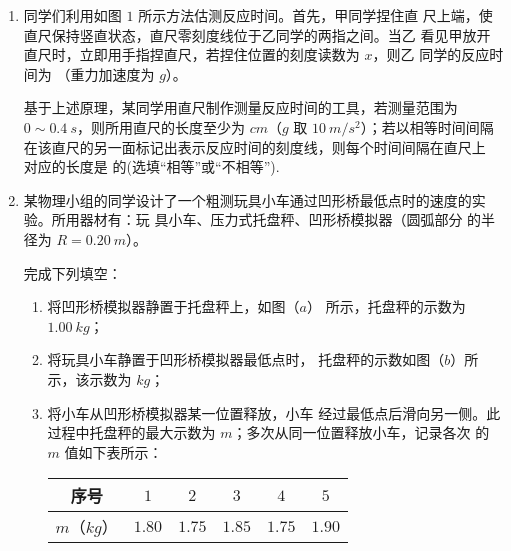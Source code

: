 \begin{enumerate}
\renewcommand{\labelenumi}{\arabic{enumi}.}
\item
{}
同学们利用如图 $ 1 $ 所示方法估测反应时间。首先，甲同学捏住直
尺上端，使直尺保持竖直状态，直尺零刻度线位于乙同学的两指之间。当乙
看见甲放开直尺时，立即用手指捏直尺，若捏住位置的刻度读数为 $ x $，则乙
同学的反应时间为  
（重力加速度为 $ g $）。
\begin{figure}[h!]
\centering

\end{figure}



基于上述原理，某同学用直尺制作测量反应时间的工具，若测量范围为 $ 0 \sim 0.4 \ s $，则所用直尺的长度至少为
$ cm $（$ g $ 取 $ 10 \ m/s^{2} $）；若以相等时间间隔
在该直尺的另一面标记出表示反应时间的刻度线，则每个时间间隔在直尺上
对应的长度是
的(选填“相等”或“不相等”).




\newpage
\item 
{}
某物理小组的同学设计了一个粗测玩具小车通过凹形桥最低点时的速度的实验。所用器材有：玩
具小车、压力式托盘秤、凹形桥模拟器（圆弧部分
的半径为 $ R=0.20 \ m $）。
\begin{figure}[h!]
\centering

\end{figure}



完成下列填空：
\begin{enumerate}
\renewcommand{\labelenumi}{\arabic{enumi}.}
\item
将凹形桥模拟器静置于托盘秤上，如图（$ a $）
所示，托盘秤的示数为 $ 1.00 \ kg $；

\item 
将玩具小车静置于凹形桥模拟器最低点时，
托盘秤的示数如图（$ b $）所示，该示数为  $ kg $；

\item 
将小车从凹形桥模拟器某一位置释放，小车
经过最低点后滑向另一侧。此过程中托盘秤的最大示数为 $ m $；多次从同一位置释放小车，记录各次
的 $ m $ 值如下表所示：
\begin{table}[h!]
\centering 
\begin{tabular}{|c|c|c|c|c|c|}
\hline 
序号 & $ 1 $ & $ 2 $ & $ 3 $ & $ 4 $ & $ 5 $
\\
\hline
$ m $（$ kg $） & $ 1.80 $ & $ 1.75 $ & $ 1.85 $ & $ 1.75 $ & $ 1.90 $\\ 
\hline 
\end{tabular}
\end{table} 



\end{enumerate}
\end{enumerate}
